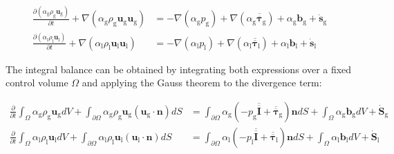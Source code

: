 \begin{subequations}
\begin{align}
\frac{\partial \left( \alpha_\mathrm{g} \rho_\mathrm{g} \boldsymbol{u}_\mathrm{g} \right) }{\partial t}  + \nabla \left( \alpha_\mathrm{g} \rho_\mathrm{g} \boldsymbol{u}_\mathrm{g}  \boldsymbol{u}_\mathrm{g} \right) &=  - \nabla \left( \alpha_\mathrm{g} p_\mathrm{g} \right) + \nabla \left( \alpha_\mathrm{g} \overline{\overline{\pmb{\tau}}}_\mathrm{g} \right) + \alpha_\mathrm{g} \boldsymbol{b}_\mathrm{g} + \dot{\boldsymbol{s}}_\mathrm{g} \\
\frac{\partial \left( \alpha_\mathrm{l} \rho_\mathrm{l} \boldsymbol{u}_\mathrm{l} \right) }{\partial t}  + \nabla \left( \alpha_\mathrm{l} \rho_\mathrm{l} \boldsymbol{u}_\mathrm{l}  \boldsymbol{u}_\mathrm{l} \right) &=  - \nabla \left( \alpha_\mathrm{l} p_\mathrm{l} \right) + \nabla \left( \alpha_\mathrm{l} \overline{\overline{\pmb{\tau}}}_\mathrm{l} \right) + \alpha_\mathrm{l} \boldsymbol{b}_\mathrm{l} + \dot{\boldsymbol{s}}_\mathrm{l}
\end{align}
\end{subequations}

The integral balance can be obtained by integrating both expressions over a fixed control volume $\Omega$ and applying the Gauss theorem to the divergence term:

\begin{subequations}
\begin{align}
\frac{\partial}{\partial t} \int_{\Omega} \alpha_\mathrm{g} \rho_\mathrm{g} \boldsymbol{u}_\mathrm{g} dV  + \int_{\partial {\Omega}} \alpha_\mathrm{g} \rho_\mathrm{g} \boldsymbol{u}_\mathrm{g} \left( \boldsymbol{u}_\mathrm{g} \cdot \boldsymbol{n} \right) dS &=  \int_{\partial {\Omega}} \alpha_\mathrm{g} \left( - p_\mathrm{g} \overline{\overline{\pmb{I}}} + \overline{\overline{\pmb{\tau}}}_\mathrm{g} \right) \boldsymbol{n} dS + \int_{\Omega} \alpha_\mathrm{g} \boldsymbol{b}_\mathrm{g} dV + \dot{\boldsymbol{S}}_\mathrm{g} \\
\frac{\partial}{\partial t} \int_{\Omega} \alpha_\mathrm{l} \rho_\mathrm{l} \boldsymbol{u}_\mathrm{l} dV  + \int_{\partial {\Omega}} \alpha_\mathrm{l} \rho_\mathrm{l} \boldsymbol{u}_\mathrm{l} \left( \boldsymbol{u}_\mathrm{l} \cdot \boldsymbol{n} \right) dS &=  \int_{\partial {\Omega}} \alpha_\mathrm{l} \left( - p_\mathrm{l} \overline{\overline{\pmb{I}}} + \overline{\overline{\pmb{\tau}}}_\mathrm{l} \right) \boldsymbol{n} dS + \int_{\Omega} \alpha_\mathrm{l}  \boldsymbol{b}_\mathrm{l} dV + \dot{\boldsymbol{S}}_\mathrm{l}
\end{align}
\end{subequations}

